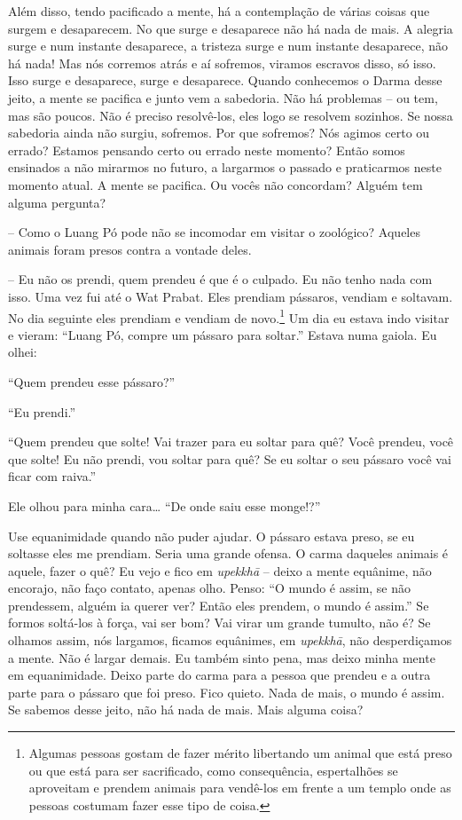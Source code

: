 Além disso, tendo pacificado a mente, há a contemplação de várias
coisas que surgem e desaparecem. No que surge e desaparece não há nada
de mais. A alegria surge e num instante desaparece, a tristeza surge e
num instante desaparece, não há nada! Mas nós corremos atrás e aí
sofremos, viramos escravos disso, só isso. Isso surge e desaparece,
surge e desaparece. Quando conhecemos o Darma desse jeito, a mente se
pacifica e junto vem a sabedoria. Não há problemas – ou tem, mas são
poucos. Não é preciso resolvê-los, eles logo se resolvem sozinhos. Se
nossa sabedoria ainda não surgiu, sofremos. Por que sofremos? Nós
agimos certo ou errado? Estamos pensando certo ou errado neste momento?
Então somos ensinados a não mirarmos no futuro, a largarmos o passado e
praticarmos neste momento atual. A mente se pacifica. Ou vocês não
concordam? Alguém tem alguma pergunta?

-- Como o Luang Pó pode não se incomodar em visitar o zoológico?
Aqueles animais foram presos contra a vontade deles.

-- Eu não os prendi, quem prendeu é que é o culpado. Eu não tenho
nada com isso. Uma vez fui até o Wat Prabat. Eles prendiam pássaros,
vendiam e soltavam. No dia seguinte eles prendiam e vendiam de
novo.\footnote{Algumas pessoas gostam de fazer mérito libertando um
animal que está preso ou que está para ser sacrificado, como
consequência, espertalhões se aproveitam e prendem animais para
vendê-los em frente a um templo onde as pessoas costumam fazer esse
tipo de coisa.} Um dia eu estava indo visitar e vieram: “Luang Pó,
compre um pássaro para soltar.” Estava numa gaiola. Eu olhei:

“Quem prendeu esse pássaro?”

“Eu prendi.”

“Quem prendeu que solte! Vai trazer para eu soltar para quê? Você
prendeu, você que solte! Eu não prendi, vou soltar para quê? Se eu
soltar o seu pássaro você vai ficar com raiva.”

Ele olhou para minha cara… “De onde saiu esse monge!?” 

Use equanimidade quando não puder ajudar. O pássaro estava preso, se
eu soltasse eles me prendiam. Seria uma grande ofensa. O carma daqueles
animais é aquele, fazer o quê? Eu vejo e fico em \textit{upekkhā} –
deixo a mente equânime, não encorajo, não faço contato, apenas olho.
Penso: “O mundo é assim, se não prendessem, alguém ia querer ver? Então
eles prendem, o mundo é assim.” Se formos soltá-los à força, vai ser
bom? Vai virar um grande tumulto, não é? Se olhamos assim, nós
largamos, ficamos equânimes, em \textit{upekkhā}, não desperdiçamos a
mente. Não é largar demais. Eu também sinto pena, mas deixo minha mente
em equanimidade. Deixo parte do carma para a pessoa que prendeu e a
outra parte para o pássaro que foi preso. Fico quieto. Nada de mais, o
mundo é assim. Se sabemos desse jeito, não há nada de mais. Mais alguma
coisa?

